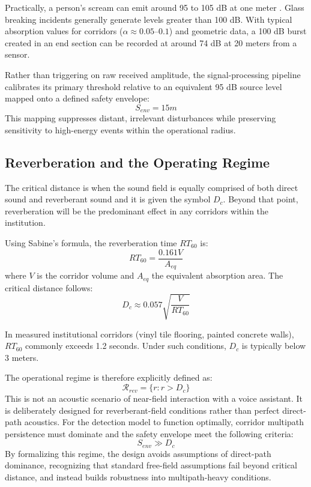 \documentclass[conference]{IEEEtran}
\begin{document}
Practically, a person’s scream can emit around 95 to 105 dB at one meter \cite{b5}. Glass breaking incidents generally generate levels greater than 100 dB. With typical absorption values for corridors ($\alpha \approx 0.05$--$0.1$) and geometric data, a 100 dB burst created in an end section can be recorded at around 74 dB at 20 meters from a sensor.

Rather than triggering on raw received amplitude, the signal-processing pipeline calibrates its primary threshold relative to an equivalent 95 dB source level mapped onto a defined safety envelope:
\begin{equation}
S_{env} = 15m
\end{equation}
This mapping suppresses distant, irrelevant disturbances while preserving sensitivity to high-energy events within the operational radius.

\subsection{Reverberation and the Operating Regime}
The critical distance is when the sound field is equally comprised of both direct sound and reverberant sound and it is given the symbol $D_c$. Beyond that point, reverberation will be the predominant effect in any corridors within the institution.

Using Sabine’s formula, the reverberation time $RT_{60}$ is:
\begin{equation}
RT_{60} = \frac{0.161 V}{A_{eq}}
\end{equation}
where $V$ is the corridor volume and $A_{eq}$ the equivalent absorption area. The critical distance follows:
\begin{equation}
D_c \approx 0.057 \sqrt{\frac{V}{RT_{60}}}
\end{equation}

In measured institutional corridors (vinyl tile flooring, painted concrete walls), $RT_{60}$ commonly exceeds 1.2 seconds. Under such conditions, $D_c$ is typically below 3 meters.

The operational regime is therefore explicitly defined as:
\begin{equation}
\mathcal{R}_{rev} = \{ r : r > D_c \}
\end{equation}
This is not an acoustic scenario of near-field interaction with a voice assistant. It is deliberately designed for reverberant-field conditions rather than perfect direct-path acoustics. For the detection model to function optimally, corridor multipath persistence must dominate and the safety envelope meet the following criteria:
\begin{equation}
S_{env} \gg D_c
\end{equation}
By formalizing this regime, the design avoids assumptions of direct-path dominance, recognizing that standard free-field assumptions fail beyond critical distance, and instead builds robustness into multipath-heavy conditions.
\end{document}
